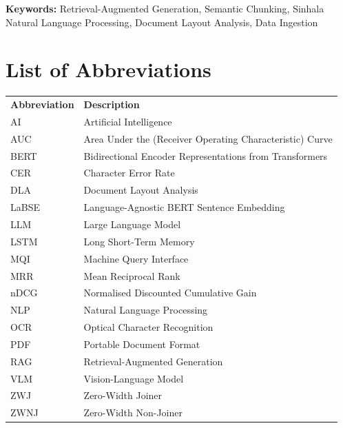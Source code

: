 \documentclass[12pt,a4paper,oneside]{report}
\begin{document}
\vspace{0.4cm}
\noindent\textbf{Keywords:} Retrieval-Augmented Generation, Semantic Chunking, Sinhala Natural Language Processing, Document Layout Analysis, Data Ingestion

\clearpage

\tableofcontents
\clearpage

\listoffigures
\clearpage

\listoftables
\clearpage

\chapter*{List of Abbreviations}
\begin{tabularx}{\textwidth}{l X}
    \textbf{Abbreviation} & \textbf{Description} \\
    AI    & Artificial Intelligence \\
    AUC   & Area Under the (Receiver Operating Characteristic) Curve \\
    BERT  & Bidirectional Encoder Representations from Transformers \\
    CER   & Character Error Rate \\
    DLA   & Document Layout Analysis \\
    LaBSE & Language-Agnostic BERT Sentence Embedding \\
    LLM   & Large Language Model \\
    LSTM  & Long Short-Term Memory \\
    MQI   & Machine Query Interface \\
    MRR   & Mean Reciprocal Rank \\
    nDCG  & Normalised Discounted Cumulative Gain \\
    NLP   & Natural Language Processing \\
    OCR   & Optical Character Recognition \\
    PDF   & Portable Document Format \\
    RAG   & Retrieval-Augmented Generation \\
    VLM   & Vision-Language Model \\
    ZWJ   & Zero-Width Joiner \\
    ZWNJ  & Zero-Width Non-Joiner \\
\end{tabularx}
\clearpage

\clearpage
{}
\end{document}
